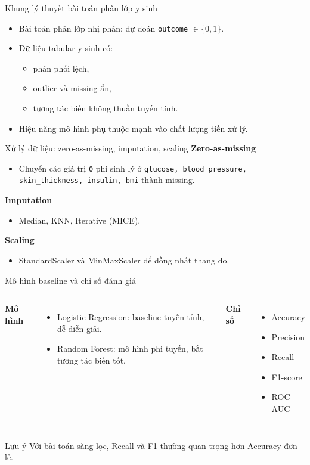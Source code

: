 \documentclass[10pt]{beamer}
\begin{document}
\begin{frame}{Khung lý thuyết bài toán phân lớp y sinh}
  \begin{itemize}
    \item Bài toán phân lớp nhị phân: dự đoán \texttt{outcome} \(\in \{0,1\}\).
    \item Dữ liệu tabular y sinh có:
      \begin{itemize}
        \item phân phối lệch,
        \item outlier và missing ẩn,
        \item tương tác biến không thuần tuyến tính.
      \end{itemize}
    \item Hiệu năng mô hình phụ thuộc mạnh vào chất lượng tiền xử lý.
  \end{itemize}
\end{frame}

\begin{frame}{Xử lý dữ liệu: zero-as-missing, imputation, scaling}
  \textbf{Zero-as-missing}
  \begin{itemize}
    \item Chuyển các giá trị \texttt{0} phi sinh lý ở \texttt{glucose, blood\_pressure, skin\_thickness, insulin, bmi} thành missing.
  \end{itemize}
  \textbf{Imputation}
  \begin{itemize}
    \item Median, KNN, Iterative (MICE).
  \end{itemize}
  \textbf{Scaling}
  \begin{itemize}
    \item StandardScaler và MinMaxScaler để đồng nhất thang đo.
  \end{itemize}
\end{frame}

\begin{frame}{Mô hình baseline và chỉ số đánh giá}
  \begin{columns}[T,totalwidth=\textwidth]
    \textbf{Mô hình}
    \begin{itemize}
      \item Logistic Regression: baseline tuyến tính, dễ diễn giải.
      \item Random Forest: mô hình phi tuyến, bắt tương tác biến tốt.
    \end{itemize}
    \textbf{Chỉ số}
    \begin{itemize}
      \item Accuracy
      \item Precision
      \item Recall
      \item F1-score
      \item ROC-AUC
    \end{itemize}
  \end{columns}
  \begin{alertblock}{Lưu ý}
    Với bài toán sàng lọc, Recall và F1 thường quan trọng hơn Accuracy đơn lẻ.
  \end{alertblock}
\end{frame}
\end{document}
